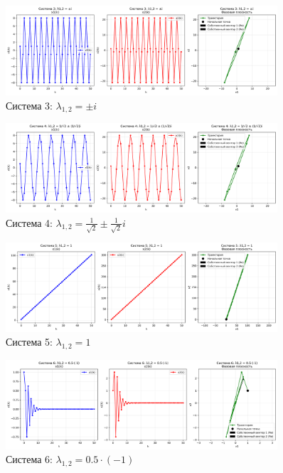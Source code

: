 \begin{figure}[H]
    \centering
    \includegraphics[width=0.9\textwidth]{images/task2/system3_lambda_pure_imaginary.png}
    \caption{Система 3: $\lambda_{1,2} = \pm i$}
\end{figure}

\begin{figure}[H]
    \centering
    \includegraphics[width=0.9\textwidth]{images/task2/system4_lambda_complex_unstable.png}
    \caption{Система 4: $\lambda_{1,2} = \tfrac{1}{\sqrt{2}} \pm \tfrac{1}{\sqrt{2}}i$}
\end{figure}

\begin{figure}[H]
    \centering
    \includegraphics[width=0.9\textwidth]{images/task2/system5_lambda_plus1.png}
    \caption{Система 5: $\lambda_{1,2} = 1$}
\end{figure}

\begin{figure}[H]
    \centering
    \includegraphics[width=0.9\textwidth]{images/task2/system6_lambda_minus1_scaled.png}
    \caption{Система 6: $\lambda_{1,2} = 0.5\cdot(-1)$}
\end{figure}

